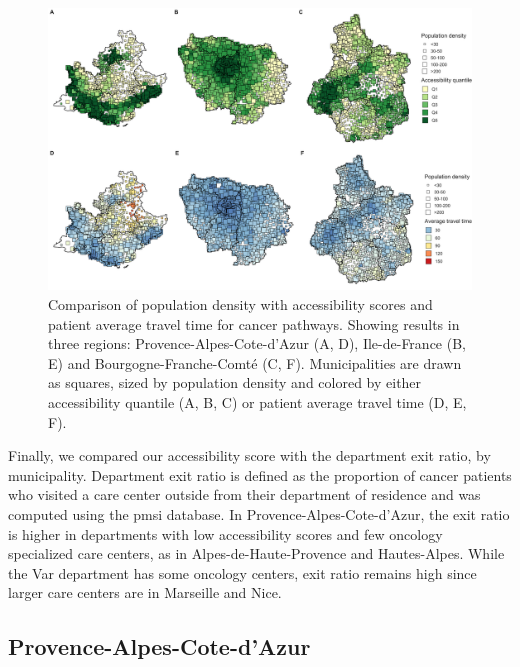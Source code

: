 \begin{figure}[H]
    \includegraphics[width=\textwidth]{images/camion/fig3_accessibility_vs_density_scatter_map.png}
    \centering
    \caption{
        Comparison of population density with accessibility scores and patient average travel time for cancer pathways. Showing results in three regions: Provence-Alpes-Cote-d’Azur (A, D), Ile-de-France (B, E) and Bourgogne-Franche-Comté (C, F). Municipalities are drawn as squares, sized by population density and colored by either accessibility quantile (A, B, C) or patient average travel time (D, E, F).
    }
    \label{fig:accessibility-vs-density}
\end{figure}

Finally, we compared our accessibility score with the department exit ratio, by municipality. Department exit ratio is defined as the proportion of cancer patients who visited a care center outside from their department of residence and was computed using the \ac{pmsi} database. In Provence-Alpes-Cote-d'Azur, the exit ratio is higher in departments with low accessibility scores and few oncology specialized care centers, as in Alpes-de-Haute-Provence and Hautes-Alpes. While the Var department has some oncology centers, exit ratio remains high since larger care centers are in Marseille and Nice.

\subsection*{Provence-Alpes-Cote-d'Azur}

